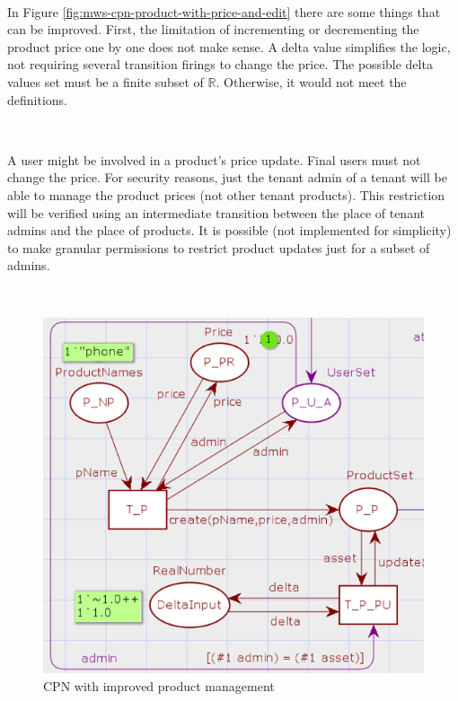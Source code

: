 \documentclass[12pt,english]{article} %
\begin{document}
\

In Figure \ref{fig:mws-cpn-product-with-price-and-edit} there are some things that can be improved.
First, the limitation of incrementing or decrementing the product price one by one does not make sense. 
A delta value simplifies the logic, not requiring several transition firings to change the price.
The possible delta values set must be a finite subset of $\mathbb{R}$.
Otherwise, it would not meet the definitions.

\

A user might be involved in a product's price update.
Final users must not change the price.
For security reasons, just the tenant admin of a tenant will be able to manage the product prices (not other tenant products).
This restriction will be verified using an intermediate transition between the place of tenant admins and the place of products.
It is possible (not implemented for simplicity) to make granular permissions to restrict product updates just for a subset of admins.

\

\begin{figure}[H]
    \centering
    \includegraphics[scale=0.7]{img/mws/cpn/mws_cpn_improved_product_update.png}
    \caption{CPN with improved product management}
    \label{fig:mws-cpn-improved-product-management}
\end{figure}
\end{document}
